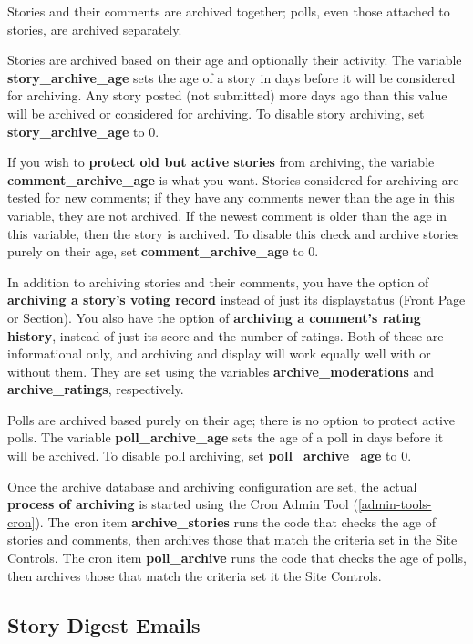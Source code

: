 Stories and their comments are archived together; polls, even those attached to stories, are archived separately.

Stories are archived based on their age and optionally their activity.  The variable {\bf story\_archive\_age} sets the age of a story in days before it will be considered for archiving.  Any story posted (not submitted) more days ago than this value will be archived or considered for archiving.  To disable story archiving, set {\bf story\_archive\_age} to 0.

If you wish to {\bf protect old but active stories} from archiving, the variable {\bf comment\_archive\_age} is what you want.  Stories considered for archiving are tested for new comments; if they have any comments newer than the age in this variable, they are not archived.  If the newest comment is older than the age in this variable, then the story is archived.  To disable this check and archive stories purely on their age, set {\bf comment\_archive\_age} to 0.

In addition to archiving stories and their comments, you have the option of {\bf archiving a story's voting record} instead of just its displaystatus (Front Page or Section).  You also have the option of {\bf archiving a comment's rating history}, instead of just its score and the number of ratings.  Both of these are informational only, and archiving and display will work equally well with or without them.  They are set using the variables {\bf archive\_moderations} and {\bf archive\_ratings}, respectively.

Polls are archived based purely on their age; there is no option to protect active polls.  The variable {\bf poll\_archive\_age} sets the age of a poll in days before it will be archived.  To disable poll archiving, set {\bf poll\_archive\_age} to 0.

Once the archive database and archiving configuration are set, the actual {\bf process of archiving} is started using the Cron Admin Tool (\ref{admin-tools-cron}).  The cron item {\bf archive\_stories} runs the code that checks the age of stories and comments, then archives those that match the criteria set in the Site Controls.  The cron item {\bf poll\_archive} runs the code that checks the age of polls, then archives those that match the criteria set it the Site Controls.

\subsection{Story Digest Emails}
\label{features-digest}

